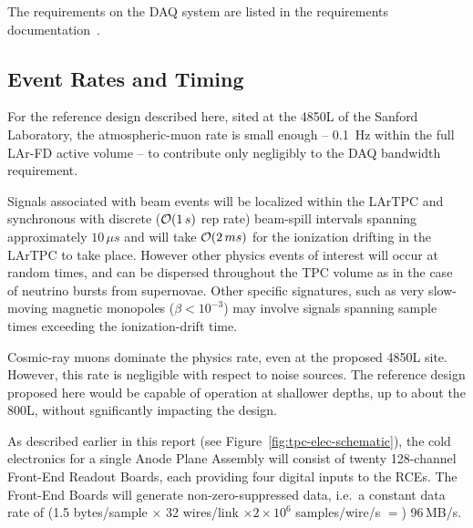 The requirements on the DAQ system are listed in the requirements
documentation~\cite{lar-fd-req}. 

\subsection{Event Rates and Timing}
\label{sec:v5-daq-assumptions}

For the reference design described here, sited at the 4850L of the Sanford Laboratory, the 
atmospheric-muon rate is small enough -- 0.1~Hz within the full LAr-FD active 
volume -- to contribute only negligibly to the DAQ bandwidth requirement.


Signals associated with beam events will be localized within the
LArTPC and synchronous with discrete (${\cal O} (1\,s)$ rep rate)
beam-spill intervals spanning approximately $10\,\mu s$ and will take
${\cal O} (2\,ms)$ for the ionization drifting in the LArTPC to take place.
However other physics events of interest will occur at random times,
and can be dispersed throughout the TPC volume as in the case of
neutrino bursts from supernovae.  Other specific signatures, such as
very slow-moving magnetic monopoles ($\beta < 10^{-3}$) may involve
signals spanning sample times exceeding the ionization-drift time.

Cosmic-ray muons dominate the physics rate, even at the proposed 4850L
site.  However, this rate is negligible with respect to noise sources.
The reference design proposed here would be capable of operation at
shallower depths, up to about the 800L, without sgnificantly impacting
the design.

As described earlier in this report (see
Figure~\ref{fig:tpc-elec-schematic}), the cold electronics for a
single Anode Plane Assembly will consist of twenty  128-channel
Front-End Readout Boards, each providing four digital inputs to the
RCEs.  The Front-End Boards will generate non-zero-suppressed data,
i.e.\ a constant data rate of (1.5 bytes/sample $\times$ 32 wires/link
$\times 2 \times 10^6$ samples/wire/s $=$) 96\,MB/s.

